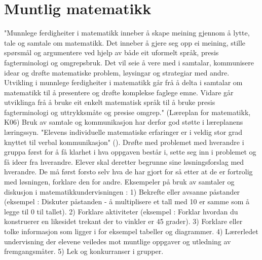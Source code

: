 \documentclass[12pt,twoside,onecolumn,norsk]{article}
\begin{document}
\section*{Muntlig matematikk}
"Munnlege ferdigheiter i matematikk inneber å skape meining gjennom å lytte, tale og 
samtale om matematikk. Det inneber å gjere seg opp ei meining, stille spørsmål og 
argumentere ved hjelp av både eit uformelt språk, presis fagterminologi og omgrepsbruk. 
Det vil seie å vere med i samtalar, kommunisere idear og drøfte matematiske problem, 
løysingar og strategiar med andre. Utvikling i munnlege ferdigheiter i matematikk går 
frå å delta i samtalar om matematikk til å presentere og drøfte komplekse faglege emne. 
Vidare går utviklinga frå å bruke eit enkelt matematisk språk til å bruke presis 
fagterminologi og uttrykksmåte og presise omgrep." (Læreplan for matematikk, K06)
\newline
\newline
Bruk av samtale og kommunikasjon har derfor god støtte i læreplanens læringssyn.
"Elevens individuelle matematiske erfaringer er i veldig stor grad knyttet til verbal
kommunikasjon" ().
\newline
\newline
Drøfte med problemet med hverandre i gruppa først for å få klarhet i hva oppgaven
består i, sette seg inn i problemet og få ideer fra hverandre.
Elever skal deretter begrunne sine løsningsforslag med hverandre. De må først forsto
selv hva de har gjort for så etter at de er fortrolig med løsningen, forklare den 
for andre.
\newline
\newline
Eksempeler på bruk av samtaler og diskusjon i matematikkundervisningen :
1) Bekrefte eller avsanne påstander (eksempel : Diskuter påstanden - å multiplisere
et tall med 10 er samme som å legge til 0 til tallet).
2) Forklare aktiviteter (eksempel : Forklar hvordan du konstruerer en likesidet 
trekant der to vinkler er 45 grader).
3) Forklare eller tolke informasjon som ligger i for eksempel tabeller og 
diagrammer.
4) Lærerledet undervisning der elevene veiledes mot muntlige oppgaver og utledning
av fremgangsmåter.
5) Lek og konkurranser i grupper.
\end{document}
